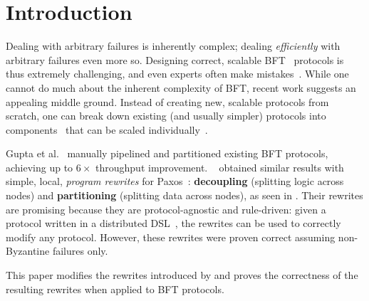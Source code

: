 \section{Introduction}
\label{sec:intro}
Dealing with arbitrary failures is inherently complex; dealing \emph{efficiently} with arbitrary failures even more so. 
Designing correct, scalable BFT~\cite{byzantineGenerals} protocols is thus extremely challenging, and even experts often make mistakes~\cite{zyzzyvaBug, protocolBugsList}.
While one cannot do much about the inherent complexity of BFT, recent work suggests an appealing middle ground.
Instead of creating new, scalable protocols from scratch, one can break down existing (and usually simpler)
protocols into components~\cite{chemistryBehindAgreement} that can be scaled individually~\cite{compartmentalized}.

Gupta et al.~\cite{resilientdb} manually pipelined and partitioned existing BFT protocols, achieving up to $6\times$ throughput improvement.
\sigmodpaper{}~\cite{autocomp,autocompTechReport} obtained similar results with simple, local, \emph{program rewrites} for Paxos~\cite{paxosComplex}: \textbf{decoupling} (splitting logic across nodes) and \textbf{partitioning} (splitting data across nodes), as seen in .
Their rewrites are promising because they are protocol-agnostic and rule-driven: given a protocol written in a distributed DSL~\cite{dedalus}, the rewrites can be used to correctly modify any protocol.
However, these rewrites were proven correct assuming non-Byzantine failures only.

This paper modifies the rewrites introduced by \sigmodpaper{} and proves the correctness of the resulting rewrites when applied to BFT protocols.

